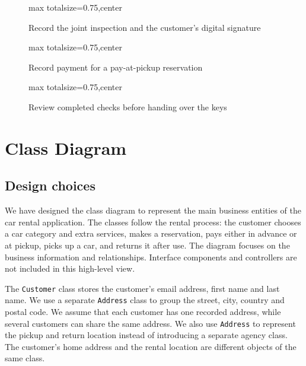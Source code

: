 \documentclass[12pt,a4paper]{report}
\begin{document}
\begin{figure}[H]
    \centering
    \begin{adjustbox}{max totalsize={\textwidth}{0.75\textheight},center}
    \end{adjustbox}
    \caption{Record the joint inspection and the customer's digital signature}
    \label{fig:lofi-ui-inspection}
\end{figure}

\begin{figure}[H]
    \centering
    \begin{adjustbox}{max totalsize={\textwidth}{0.75\textheight},center}
    \end{adjustbox}
    \caption{Record payment for a pay-at-pickup reservation}
    \label{fig:lofi-ui-payment}
\end{figure}

\begin{figure}[H]
    \centering
    \begin{adjustbox}{max totalsize={\textwidth}{0.75\textheight},center}
    \end{adjustbox}
    \caption{Review completed checks before handing over the keys}
    \label{fig:lofi-ui-handover}
\end{figure}

\chapter{Class Diagram}
\section{Design choices}

We have designed the class diagram to represent the main business entities of the car rental application. The classes follow the rental process: the customer chooses a car category and extra services, makes a reservation, pays either in advance or at pickup, picks up a car, and returns it after use. The diagram focuses on the business information and relationships. Interface components and controllers are not included in this high-level view.

The \texttt{Customer} class stores the customer's email address, first name and last name. We use a separate \texttt{Address} class to group the street, city, country and postal code. We assume that each customer has one recorded address, while several customers can share the same address. We also use \texttt{Address} to represent the pickup and return location instead of introducing a separate agency class. The customer's home address and the rental location are different objects of the same class.
\end{document}
